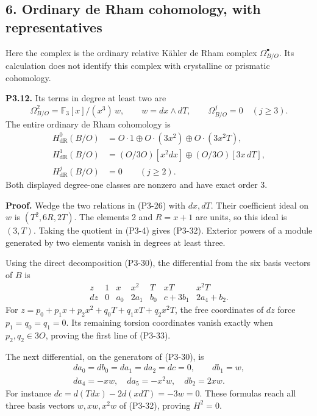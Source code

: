 \documentclass[
]{article}
\begin{document}
\subsection{6. Ordinary de Rham cohomology, with
representatives}\label{ordinary-de-rham-cohomology-with-representatives}

Here the complex is the ordinary relative Kähler de Rham complex
\(\Omega^\bullet_{B/O}\). Its calculation does not identify this complex
with crystalline or prismatic cohomology.

\textbf{P3.12.} Its terms in degree at least two are \[
\Omega^2_{B/O}=\mathbb F_3[x]/(x^3)\,w,
\qquad w=dx\wedge dT,\qquad \Omega^j_{B/O}=0\quad(j\ge3).
\tag{P3-32}
\] The entire ordinary de Rham cohomology is \[
\begin{aligned}
H^0_{\mathrm{dR}}(B/O)&=O\cdot1\oplus O\cdot(3x^2)
\oplus O\cdot(3x^2T),\\
H^1_{\mathrm{dR}}(B/O)&=(O/3O)[x^2dx]
\oplus(O/3O)[3x\,dT],\\
H^j_{\mathrm{dR}}(B/O)&=0\qquad(j\ge2).
\end{aligned}
\tag{P3-33}
\] Both displayed degree-one classes are nonzero and have exact order 3.

\textbf{Proof.} Wedge the two relations in (P3-26) with \(dx,dT\). Their
coefficient ideal on \(w\) is \((T^2,6R,2T)\). The elements 2 and
\(R=x+1\) are units, so this ideal is \((3,T)\). Taking the quotient in
(P3-4) gives (P3-32). Exterior powers of a module generated by two
elements vanish in degrees at least three.

Using the direct decomposition (P3-30), the differential from the six
basis vectors of \(B\) is \[
\begin{array}{c|rrrrrr}
z&1&x&x^2&T&xT&x^2T\\ \hline
dz&0&a_0&2a_1&b_0&c+3b_1&2a_4+b_2.
\end{array}
\tag{P3-34}
\] For \(z=p_0+p_1x+p_2x^2+q_0T+q_1xT+q_2x^2T\), the free coordinates of
\(dz\) force \(p_1=q_0=q_1=0\). Its remaining torsion coordinates vanish
exactly when \(p_2,q_2\in3O\), proving the first line of (P3-33).

The next differential, on the generators of (P3-30), is \[
\begin{gathered}
da_0=db_0=da_1=da_2=dc=0,\qquad db_1=w,\\
da_4=-xw,\quad da_5=-x^2w,\quad db_2=2xw.
\end{gathered}
\tag{P3-35}
\] For instance \(dc=d(Tdx)-2d(xdT)=-3w=0\). These formulas reach all
three basis vectors \(w,xw,x^2w\) of (P3-32), proving \(H^2=0\).
\end{document}
